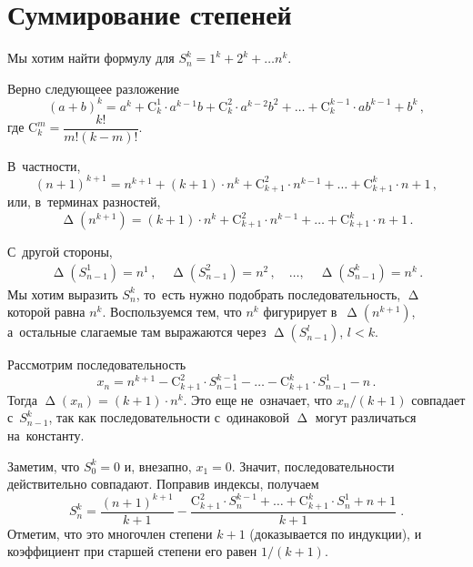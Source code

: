 
\section*{Суммирование степеней}



\begingroup
    \def\abs#1{\lvert #1 \rvert}%
    \def\Abs#1{\left \lvert #1 \right \rvert}%
    \def\binom#1#2{\mathrm{C}_{#1}^{#2}}%
    \ifdefined\mathup
        \def\diff{\mathop{\mathup{\Delta}}}%
    \else
        \def\diff{\mathop{\Delta}}%
    \fi
    \def\sumpow#1#2{S^{#1}_{#2}}%

Мы хотим найти формулу для $\sumpow{k}{n} = 1^{k} + 2^{k} + \ldots n^{k}$.

Верно следующеее разложение
\[
    (a + b)^{k}
=
    a^{k} + \binom{k}{1} \cdot a^{k-1} b + \binom{k}{2} \cdot a^{k-2} b^{2}
    + \ldots +
    \binom{k}{k-1} \cdot a b^{k-1} + b^{k}
\, , \]
где $\binom{k}{m} = \dfrac{k!}{m! (k - m)!}$.

В~частности,
\[
    (n + 1)^{k+1}
=
    n^{k+1} + (k + 1) \cdot n^{k} + \binom{k+1}{2} \cdot n^{k-1}
    + \ldots +
    \binom{k+1}{k} \cdot n + 1
\, , \]
или, в~терминах разностей,
\[
    \diff(n^{k+1})
=
    (k + 1) \cdot n^{k} + \binom{k+1}{2} \cdot n^{k-1}
    + \ldots +
    \binom{k+1}{k} \cdot n + 1
\, . \]

С~другой стороны,
\begin{gather*}
    \diff(\sumpow{1}{n-1}) = n^{1}
\, , \quad
    \diff(\sumpow{2}{n-1}) = n^{2}
\, , \quad \ldots, \quad
    \diff(\sumpow{k}{n-1}) = n^{k}
\, . \end{gather*}
Мы хотим выразить $\sumpow{k}{n}$, то~есть нужно подобрать последовательность,
$\diff$ которой равна $n^{k}$.
Воспользуемся тем, что $n^{k}$ фигурирует в~$\diff(n^{k+1})$, а~остальные
слагаемые там выражаются через $\diff(\sumpow{l}{n-1})$, $l < k$.

Рассмотрим последовательность
\[
    x_{n}
=
    n^{k+1} - \binom{k+1}{2} \cdot \sumpow{k-1}{n-1}
    - \ldots
    - \binom{k+1}{k} \cdot \sumpow{1}{n-1}
    - n
\, . \]
Тогда $\diff(x_{n}) = (k + 1) \cdot n^{k}$.
Это еще не~означает, что $x_{n} / (k + 1)$ совпадает с~$\sumpow{k}{n-1}$,
так как последовательности с~одинаковой $\diff$ могут различаться на~константу.

Заметим, что $\sumpow{k}{0} = 0$ и, внезапно, $x_{1} = 0$.
Значит, последовательности действительно совпадают.
Поправив индексы, получаем
\[
    \sumpow{k}{n}
=
    \frac{(n + 1)^{k+1}}{k + 1}
    -
    \frac{
        \binom{k+1}{2} \cdot \sumpow{k-1}{n}
        + \ldots +
        \binom{k+1}{k} \cdot \sumpow{1}{n}
        + n + 1
    }{k + 1}
\; . \]
Отметим, что это многочлен степени $k + 1$ (доказывается по индукции),
и коэффициент при старшей степени его равен $1 / (k + 1)$.


